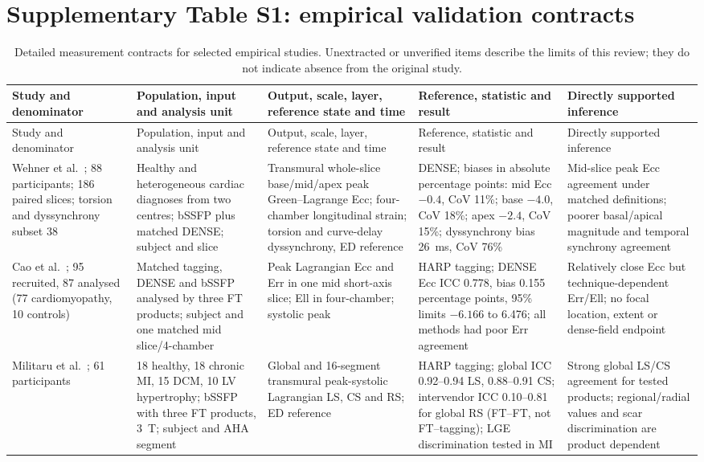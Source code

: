 \documentclass[11pt,a4paper]{article}
\begin{document}
\setcounter{table}{0}
\renewcommand{\theHtable}{supplement-numbered.\arabic{table}}
\section*{Supplementary Table S1: empirical validation contracts}

{\scriptsize\sloppy
\begin{longtable}{L{0.12\textwidth}L{0.16\textwidth}L{0.17\textwidth}L{0.20\textwidth}L{0.15\textwidth}}
\caption{Detailed measurement contracts for selected empirical studies. Unextracted or unverified items describe the limits of this review; they do not indicate absence from the original study.}\\
\toprule
Study and denominator & Population, input and analysis unit & Output, scale, layer, reference state and time & Reference, statistic and result & Directly supported inference \\
\midrule
\endfirsthead
\toprule
Study and denominator & Population, input and analysis unit & Output, scale, layer, reference state and time & Reference, statistic and result & Directly supported inference \\
\midrule
\endhead
Wehner et al.~\cite{wehner2018}; 88 participants; 186 paired slices; torsion and dyssynchrony subset 38 & Healthy and heterogeneous cardiac diagnoses from two centres; bSSFP plus matched DENSE; subject and slice & Transmural whole-slice base/mid/apex peak Green--Lagrange Ecc; four-chamber longitudinal strain; torsion and curve-delay dyssynchrony, ED reference & DENSE; biases in absolute percentage points: mid Ecc $-0.4$, CoV 11\%; base $-4.0$, CoV 18\%; apex $-2.4$, CoV 15\%; dyssynchrony bias 26~ms, CoV 76\% & Mid-slice peak Ecc agreement under matched definitions; poorer basal/apical magnitude and temporal synchrony agreement \\
\addlinespace
Cao et al.~\cite{cao2018}; 95 recruited, 87 analysed (77 cardiomyopathy, 10 controls) & Matched tagging, DENSE and bSSFP analysed by three FT products; subject and one matched mid slice/4-chamber & Peak Lagrangian Ecc and Err in one mid short-axis slice; Ell in four-chamber; systolic peak & HARP tagging; DENSE Ecc ICC 0.778, bias 0.155 percentage points, 95\% limits $-6.166$ to 6.476; all methods had poor Err agreement & Relatively close Ecc but technique-dependent Err/Ell; no focal location, extent or dense-field endpoint \\
\addlinespace
Militaru et al.~\cite{militaru2021}; 61 participants & 18 healthy, 18 chronic MI, 15 DCM, 10 LV hypertrophy; bSSFP with three FT products, 3~T; subject and AHA segment & Global and 16-segment transmural peak-systolic Lagrangian LS, CS and RS; ED reference & HARP tagging; global ICC 0.92--0.94 LS, 0.88--0.91 CS; intervendor ICC 0.10--0.81 for global RS (FT--FT, not FT--tagging); LGE discrimination tested in MI & Strong global LS/CS agreement for tested products; regional/radial values and scar discrimination are product dependent \\

\end{longtable}}
\end{document}

